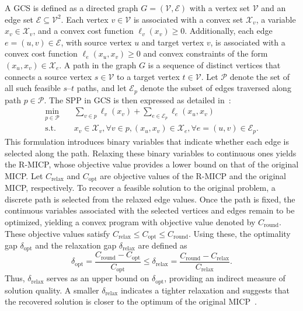 \documentclass[letterpaper, 10 pt, journal, twoside]{IEEEtran}
\begin{document}
A GCS is defined as a directed graph $G = (\mathcal{V}, \mathcal{E})$ with a vertex set $\mathcal{V}$ and an edge set $\mathcal{E} \subseteq \mathcal{V}^2$. 
Each vertex $v \in \mathcal{V}$ is associated with a convex set $\mathcal{X}_v$, a variable $x_v \in \mathcal{X}_v$, and a convex cost function \( \ell_v(x_v) \ge 0 \). 
Additionally, each edge \( e = (u, v) \in \mathcal{E} \), with source vertex \(u\) and target vertex \(v\), is associated with a convex cost function \( \ell_e(x_u,x_v) \ge 0 \) and convex constraints of the form \( (x_u, x_v) \in \mathcal{X}_e \).
A path in the graph \( G \) is a sequence of distinct vertices that connects a source vertex \( s \in \mathcal{V} \) to a target vertex \( t \in \mathcal{V} \).  
Let \( \mathcal{P} \) denote the set of all such feasible \( s\text{–}t \) paths, and let \( \mathcal{E}_p \) denote the subset of edges traversed along path \( p \in \mathcal{P} \).  
The SPP in GCS is then expressed as detailed in~\cite{marcucci2024shortest}:
\begin{equation}
\begin{aligned}
\min_{p \in \mathcal{P}} \quad
& \sum_{v \in p} \ell_v(x_v) + \sum_{e\in\mathcal{E}_p} \ell_e(x_u,x_v) \\
\text{s.t.}\quad
& x_v \in \mathcal{X}_v,\! \forall v \in p,\!
  (x_u,x_v) \in \mathcal{X}_e,\! \forall e=(u,v)\in\mathcal{E}_p.
\end{aligned}
\label{eq:sppGCS}
\end{equation}
This formulation introduces binary variables that indicate whether each edge is selected along the path. 
Relaxing these binary variables to continuous ones yields the R-MICP, whose objective value provides a lower bound on that of the original MICP. 
Let \( C_{\text{relax}} \) and \( C_{\text{opt}} \) are objective values of the R-MICP and the original MICP, respectively. 
To recover a feasible solution to the original problem, a discrete path is selected from the relaxed edge values. 
Once the path is fixed, the continuous variables associated with the selected vertices and edges remain to be optimized, yielding a convex program with objective value denoted by \( C_{\text{round}} \).
These objective values satisfy \( C_{\text{relax}} \leq C_{\text{opt}} \leq C_{\text{round}} \).
Using these, the optimality gap \( \delta_{\text{opt}} \) and the relaxation gap \( \delta_{\text{relax}} \) are defined as
\begin{equation}\label{eq:relax_gap_def}
    \delta_{\text{opt}} = \frac{C_{\text{round}} - C_{\text{opt}}}{C_{\text{opt}}}
    \leq \delta_{\text{relax}} = \frac{C_{\text{round}} - C_{\text{relax}}}{C_{\text{relax}}}.
\end{equation}
\noindent
Thus, \( \delta_{\text{relax}} \) serves as an upper bound on \( \delta_{\text{opt}} \), providing an indirect measure of solution quality. A smaller \( \delta_{\text{relax}} \) indicates a tighter relaxation and suggests that the recovered solution is closer to the optimum of the original MICP~\cite{marcucci2023motion}.
\end{document}
